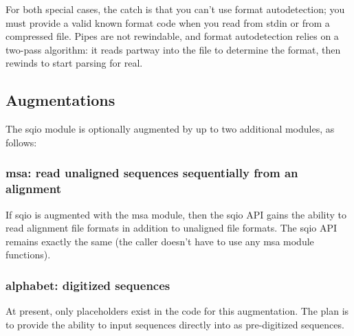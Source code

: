 For both special cases, the catch is that you can't use format
autodetection; you must provide a valid known format code when you
read from stdin or from a compressed file. Pipes are not rewindable,
and format autodetection relies on a two-pass algorithm: it reads
partway into the file to determine the format, then rewinds to start
parsing for real.

\subsection{Augmentations}

The sqio module is optionally augmented by up to two additional
modules, as follows:

\subsubsection{msa: read unaligned sequences sequentially from an alignment}

If sqio is augmented with the msa module, then the sqio API gains the
ability to read alignment file formats in addition to unaligned file
formats. The sqio API remains exactly the same (the caller doesn't
have to use any msa module functions).

\subsubsection{alphabet: digitized sequences}

At present, only placeholders exist in the code for this augmentation.
The plan is to provide the ability to input sequences directly into
 as pre-digitized sequences.






